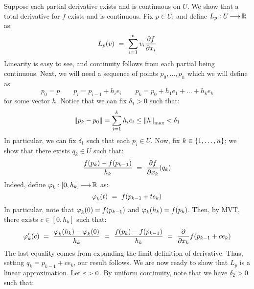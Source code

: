 \begin{pf}[title=Backward direction]
    Suppose each partial derivative exists and is continuous on $ U $. We show
    that a total derivative for $ f $ exists and is continuous. \vsp
    Fix $ p \in U $, and define $ L_{p}:U\operatorname{\longrightarrow}\mathbb{R} $ as:
    \begin{equation*}
        L_{p}(v) \ = \ \sum_{i=1}^{n}v_{i}\frac{\partial f}{\partial x_{i}}
    \end{equation*}
    Linearity is easy to see, and continuity follows from each partial being
    continuous. Next, we will need a sequence of points $ p_{0},\dots,
    p_{n} $ which we will define as:
    \begin{equation*}
        p_{0} = p \qquad p_{i}=p_{i-1}+h_{i}e_{i} \qquad
        p_{k} = p_{0}+h_{1}e_{1}+\dots +h_{k}e_{k}
    \end{equation*}
    for some vector $ h $. Notice that we can fix $ \delta_{1} > 0 $ such that:
    \begin{equation*}
        \left\|p_{k}-p_{0}\right\|= \sum_{i=1}^{k}h_{i}e_{i} \leq \left\|h\right\|_{\textrm{max}}
        < \delta_{1}
    \end{equation*}
    In particular, we can fix $ \delta_{1} $ such that each $ p_{i} \in U $.
    Now, fix $ k \in \left\{{1,\dots,n}\right\} $; we show that there exists $ q_{k} \in
    U $ such that:
    \begin{equation*}
        \frac{f(p_{k})-f(p_{k-1})}{h_{k}} \ = \ \frac{\partial f}{\partial x_{k}}(q_{k})
    \end{equation*}
    Indeed, define $ \operatorname{\varphi}_{k}:[0,h_{k}]\operatorname{\longrightarrow}\mathbb{R} $ as:
    \begin{equation*}
        \operatorname{\varphi}_{k}(t) \ = \ f(p_{k-1}+te_{k})
    \end{equation*}
    In particular, note that $ \operatorname{\varphi}_{k}(0)=f(p_{k-1}) $ and $ \operatorname{\varphi}_{k}(h_{k})
    = f(p_{k}) $. Then, by MVT, there exists $ c \in [0, h_{k}] $ such that:
    \begin{equation*}
        \vphi_{k}'(c) \ = \ \frac{\vphi_{k}(h_{k})-\vphi_{k}(0)}{h_{k}}
        \ = \ \frac{f(p_{k})-f(p_{k-1})}{h_{k}} \ = \
        \frac{\p}{\p x_{k}}f(p_{k-1}+ce_{k})
    \end{equation*}
    The last equality comes from expanding the limit definition of derivative.
    Thus, setting $ q_{k} = p_{k-1}+ce_{k} $, our result follows. \vsp
    We are now ready to show that $ L_{p} $ is a linear approximation.
    Let $ \operatorname{\varepsilon} > 0 $. By uniform continuity, note that we have $ \delta_{2} > 0 $
    such that:
    \begin{equation*}

\end{equation*}
\end{pf}
